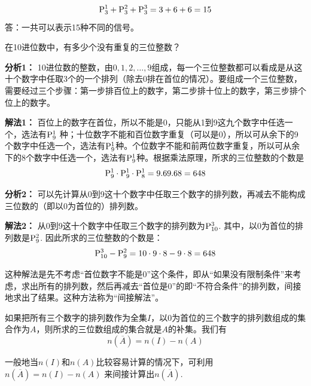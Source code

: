 \begin{solution}
    $$\perm{3}{1}+\perm{3}{2}+\perm{3}{3}=3+6+6=15$$
答：一共可以表示15种不同的信号。
\end{solution}

\begin{example}
    在10进位数中，有多少个没有重复的三位整数？
\end{example}


\textbf{分析1：}    10进位数的整数，由$0,1,2,\ldots,9$组成，每一个三位整数都可以看成是从这十个数字中任取3个的一个排列（除去0排在首位的情况）。要组成一个三位整数，需要经过三个步骤：第一步排百位上的数字，第二步排十位上的数字，第三步排个位上的数字。

\textbf{解法1：}
百位上的数字在首位，所以不能是0，只能从1到9这九个数字中任选一个，选法有$\perm{9}{1}$ 种；十位数字不能和百位数字重复（可以是0），所以可从余下的9个数字中任选一个，选法有$\perm{9}{1}$种。个位数字不能和前两位数字重复，所以可从余下的8个数字中任选一个，选法有$\perm{9}{1}$种。根据乘法原理，所求的三位整数的个数是
\[\perm{9}{1}\cdot \perm{9}{1}\cdot \perm{8}{1}=9\x 9\x 8=648\]
\begin{figure}[htp]
    \centering
{}
    \caption{}
\end{figure}

\textbf{分析2：}
    可以先计算从0到9这十个数字中任取三个数字的排列数，再减去不能构成三位数的（即以0为首位的）排列数。

\textbf{解法2：}
    从0到9这十个数字中任取三个数字的排列数为$\perm{10}{3}$. 其中，以0为首位的排列数是$\perm{9}{2}$. 因此所求的三位整数的个数是：
\[\perm{10}{3}-\perm{9}{2}=10\cdot 9\cdot 8-9\cdot 8=648\]


\begin{rmk}
    这种解法是先不考虑“首位数字不能是0”这个条件，即从“如果没有限制条件”来考虑，求出所有的排列数，然后再减去“首位是0”的即“不符合条件”的排列数，间接地求出了结果。这种方法称为“间接解法”。
\end{rmk}

如果把所有三个数字的排列数作为全集$I$，以0为首位的三个数字的排列数组成的集合作为$A$，则所求的三位数组成的集合就是$A$的补集。我们有
\[n(\overline{A})=n(I)-n(A)\]

一般地当$n(I)$和$n(A)$比较容易计算的情况下，可利用$n(\overline{A})=n(I)-n(A)$ 来间接计算出$n(\overline{A})$.


